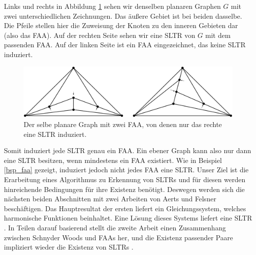 \begin{example}\label{bsp_faa}
Links und rechts in Abbildung \ref{exp_faa} sehen wir denselben planaren Graphen $G$ mit zwei unterschiedlichen Zeichnungen. Das äußere Gebiet ist bei beiden dasselbe. Die Pfeile stellen hier die Zuweisung der Knoten zu den inneren Gebieten dar (also das FAA). Auf der rechten Seite sehen wir eine SLTR von $G$ mit dem passenden FAA. Auf der linken Seite ist ein FAA eingezeichnet, das keine SLTR induziert.

\begin{figure}[h]
	\centering
  \includegraphics[width=1\textwidth]{faa_def.png}
  \caption{Der selbe planare Graph mit zwei FAA, von denen nur das rechte eine SLTR induziert.}
  \label{exp_faa}
\end{figure}
\end{example}

Somit induziert jede SLTR genau ein FAA. Ein ebener Graph kann also nur dann eine SLTR besitzen, wenn mindestens ein FAA existiert. Wie in Beispiel \ref{bsp_faa} gezeigt, induziert jedoch nicht jedes FAA eine SLTR. Unser Ziel ist die Erarbeitung eines Algorithmus zu Erkennung von SLTRs und für diesen werden hinreichende Bedingungen für ihre Existenz benötigt. Deswegen werden sich die nächsten beiden Abschnitten mit zwei Arbeiten von Aerts und Felsner beschäftigen. Das Hauptresultat der ersten liefert ein Gleichungssystem, welches harmonische Funktionen beinhaltet. Eine Lösung dieses Systems liefert eine SLTR \cite{af13}. In Teilen darauf basierend stellt die zweite Arbeit einen Zusammenhang zwischen Schnyder Woods und FAAs her, und die Existenz passender Paare impliziert wieder die Existenz von SLTRs \cite{af15}.



